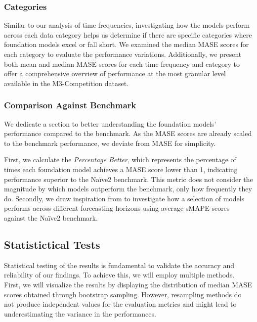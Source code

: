 \documentclass[12pt,a4paper]{article}
\begin{document}
\subsubsection{Categories}

Similar to our analysis of time frequencies, investigating how the models perform across each data category helps us determine if there are specific categories where foundation models excel or fall short. We examined the median MASE scores for each category to evaluate the performance variations. Additionally, we present both mean and median MASE scores for each time frequency and category to offer a comprehensive overview of performance at the most granular level available in the M3-Competition dataset. 

\subsubsection{Comparison Against Benchmark}

We dedicate a section to better understanding the foundation models' performance compared to the benchmark. As the MASE scores are already scaled to the benchmark performance, we deviate from MASE for simplicity.

First, we calculate the \textit{Percentage Better}, which represents the percentage of times each foundation model achieves a MASE score lower than 1, indicating performance superior to the Naïve2 benchmark. This metric does not consider the magnitude by which models outperform the benchmark, only how frequently they do. Secondly, we draw inspiration from \cite{MAKRIDAKIS2000} to investigate how a selection of models performs across different forecasting horizons using average sMAPE scores against the Naïve2 benchmark. 


\subsection{Statistictical Tests}

Statistical testing of the results is fundamental to validate the accuracy and reliability of our findings. To achieve this, we will employ multiple methods. First, we will visualize the results by displaying the distribution of median MASE scores obtained through bootstrap sampling. However, resampling methods do not produce independent values for the evaluation metrics and might lead to underestimating the variance in the performances.
\end{document}
